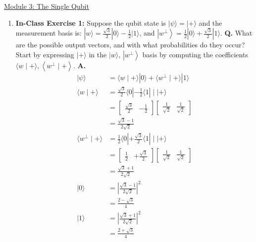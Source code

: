 \documentclass[main.tex]{subfiles}
\begin{document}
\href{https://www2.seas.gwu.edu/~simhaweb/quantum/modules/module3/module3.html}{Module 3: The Single Qubit}

\begin{enumerate}

\item[] \textbf{In-Class Exercise 1:} Suppose the qubit state is $|\psi\rangle=|+\rangle$ and the measurement basis is: $|w\rangle=\frac{\sqrt{3}}{2}|0\rangle-\frac{1}{2}|1\rangle$, and $\left|w^{\perp}\right\rangle=\frac{1}{2}|0\rangle+\frac{\sqrt{3}}{2}|1\rangle$. \textbf{Q.} What are the possible output vectors, and with what probabilities do they occur? Start by expressing $|+\rangle$ in the $|w\rangle$, $\left|w^{\perp}\right\rangle$ basis by computing the coefficients $\langle w \mid+\rangle,\left\langle w^{\perp} \mid+\right\rangle$. \textbf{A.} 
\begin{align*}
    |\psi\rangle                    & = \langle w \mid+\rangle |0\rangle +  \langle w^{\perp} \mid+\rangle | 1 \rangle\\
    \langle w \mid+\rangle          & = \frac{\sqrt{3}}{2}\langle 0 |- \frac{1}{2} \langle 1| \mid | + \rangle\\
                                    & = \left[ \begin{array}{ll} \frac{\sqrt{3}}{2} & -\frac{1}{2} \end{array} \right]
                                    \left[ \begin{array}{l} \frac{1}{\sqrt{2}} & \frac{1}{\sqrt{2}} \end{array} \right]\\
                                    & = \frac{\sqrt{3}-1}{2\sqrt{2}}\\
    \langle w^{\perp} \mid+\rangle  & = \frac{1}{2}\langle 0 | + \frac{\sqrt{3}}{2} \langle 1| \mid | + \rangle\\
                                    & = \left[ \begin{array}{ll} \frac{1}{2} & + \frac{\sqrt{3}}{2} \end{array} \right]
                                    \left[ \begin{array}{l} \frac{1}{\sqrt{2}} & \frac{1}{\sqrt{2}} \end{array} \right]\\
                                    & = \frac{\sqrt{3}+1}{2\sqrt{2}}\\
    |0\rangle                       & = \left| \frac{\sqrt{3}-1}{2\sqrt{2}} \right|^2 \tag{output vector}\\ 
                                    & =\frac{2-\sqrt{3}}{4} \tag{probability outcome}\\
    |1\rangle                       & = \left| \frac{\sqrt{3}+1}{2\sqrt{2}} \right|^2 \tag{output vector}\\
                                    & =\frac{2+\sqrt{3}}{4} \tag{probability outcome}
\end{align*}


\end{enumerate}
\end{document}
